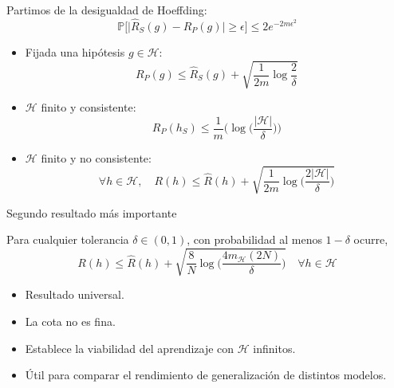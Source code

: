 \begin{frame}
        Partimos de la desigualdad de Hoeffding:
        \begin{equation*}
            \mathbb{P} \Big[ \Big| \hat{R}_S(g) - R_{P}(g) \Big| \geq \epsilon \Big] \leq 2 e^{-2m\epsilon^2 }
        \end{equation*}
        \pause
        \begin{itemize}
            \item Fijada una hipótesis $g \in \mathcal{H}$: \begin{equation*}
                 R_P(g) \leq \hat{R}_S(g) + \sqrt{\frac{1}{2m}\log{\frac{2}{\delta}}}
             \end{equation*}
        \pause             
             \item $\mathcal{H}$ finito y consistente:          \begin{equation*}
            R_P(h_S) \leq \frac{1}{m}\Big( \log\Big(\frac{|\mathcal{H}|}{\delta}\Big) \Big) 
         \end{equation*}
        \pause
             
             
             \item $\mathcal{H}$ finito y no consistente:             \begin{equation*}
            \forall h \in \mathcal{H}, \quad R(h) \leq \hat{R}(h) + \sqrt{\frac{1}{2m} \log \Big( \frac{2|\mathcal{H}|}{\delta} \Big)}
            \end{equation*}
        \end{itemize}
\end{frame}



\begin{frame}{Segundo resultado más importante}
    \begin{theorem}
        Para cualquier tolerancia $\delta \in (0,1)$, con probabilidad al menos $1-\delta$ ocurre,
            \begin{equation}
                R(h) \leq \hat{R}(h) + \sqrt{\frac{8}{N}\log\Big(\frac{4m_{\mathcal{H}}(2N)}{\delta}\Big)} \quad \forall h \in \mathcal{H}
            \end{equation}
    \end{theorem}
    
    \pause
    
    \begin{itemize}
        \item Resultado universal.
        \item La cota no es fina.
        \item Establece la viabilidad del aprendizaje con $\mathcal{H}$ infinitos.
        \item Útil para comparar el rendimiento de generalización de distintos modelos.
    \end{itemize}
\end{frame}